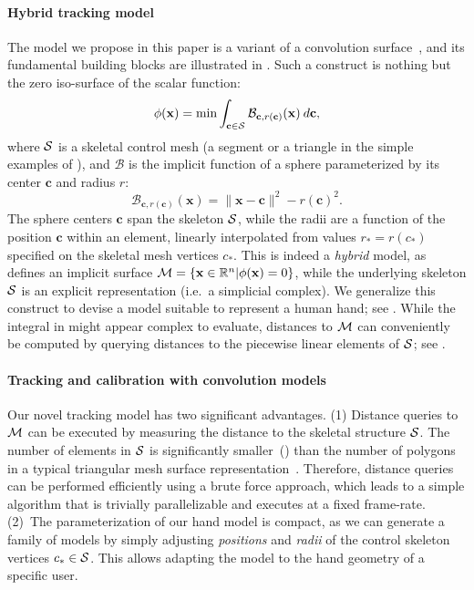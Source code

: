 \paragraph{Hybrid tracking model}
The model we propose in this paper is a variant of a convolution surface~\cite{bloomenthal1991convolution}, and its fundamental building blocks are illustrated in . Such a construct is nothing but the zero iso-surface of the scalar function:
\begin{equation}
\phi(\mathbf{x}) = \min \int_{\mathbf{c} \in \mathcal{S}} \mathcal{B}_{\mathbf{c}, r(\mathbf{c})}(\mathbf{x}) \: d\mathbf{c},
\label{eq:convsurf}
\end{equation}
where $\mathcal{S}$ is a skeletal control mesh (a segment or a triangle in the simple examples of ), and $\mathcal{B}$ is the implicit function of a sphere parameterized by its center $\mathbf{c}$ and radius $r$:
\begin{equation}
\mathcal{B}_{\mathbf{c}, r(\mathbf{c})}(\mathbf{x}) = \|\mathbf{x}-\mathbf{c}\|^2 - r(\mathbf{c})^2.
\end{equation}
The sphere centers $\mathbf{c}$ span the skeleton $\mathcal{S}$, while the radii are a function of the position $\mathbf{c}$ within an element, linearly interpolated from values $r_*=r(c_*)$ specified on the skeletal mesh vertices $c_*$. This is indeed a \emph{hybrid} model, as  defines an implicit surface $\mathcal{M} = \{\mathbf{x} \in \mathbb{R}^n | \phi(\mathbf{x})=0 \}$, while the underlying skeleton $\mathcal{S}$ is an explicit representation (i.e.\ a simplicial complex). We generalize this construct to devise a model suitable to represent a human hand; see .
While the integral in  might appear complex to evaluate, distances to $\mathcal{M}$ can conveniently be computed by querying distances to the piecewise linear elements of $\mathcal{S}$; see .


\paragraph{Tracking and calibration with convolution models}
Our novel tracking model has two significant advantages. (1) Distance queries to $\mathcal{M}$ can be executed by measuring the distance to the skeletal structure $\mathcal{S}$. The number of elements in $\mathcal{S}$ is significantly smaller~()  than the number of polygons in a typical triangular mesh surface representation~\cite{thiery2013sphere}. 
Therefore, distance queries can be performed efficiently using a brute force approach, which leads to a simple algorithm that is trivially parallelizable and executes at a fixed frame-rate. (2)~The parameterization of our hand model is compact, as we can generate a family of models by simply adjusting \emph{positions} and \emph{radii} of the control skeleton vertices $c_* \in \mathcal{S}$. This allows adapting the model to the hand geometry of a specific user.

